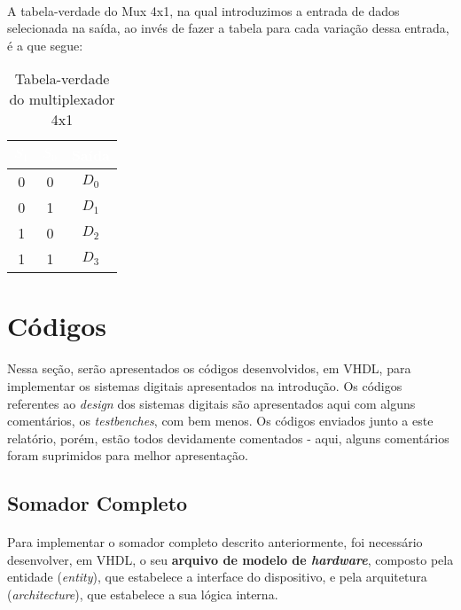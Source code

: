 \documentclass[a4paper,12pt]{article}
\begin{document}
\paragraph{}
A tabela-verdade do Mux 4x1, na qual introduzimos a entrada de dados selecionada na saída, ao invés de fazer a tabela para cada variação dessa entrada, é a que segue:

\begin{table}[H]
    \centering
    \begin{tabular}{|c|c|c|}
        \hline
        \rowcolor{black}
        \textcolor{white}{$S_1$} & \textcolor{white}{$S_0$} & \textcolor{white}{Saída} \\ \hline
        0 & 0 & $D_0$ \\ \hline
        \rowcolor{cinza}
        0 & 1 & $D_1$ \\ \hline
        1 & 0 & $D_2$ \\ \hline
        \rowcolor{cinza}
        1 & 1 & $D_3$ \\ \hline
    \end{tabular}
    \caption{Tabela-verdade do multiplexador 4x1}
\end{table}

\newpage

\section{Códigos}
\paragraph{}
Nessa seção, serão apresentados os códigos desenvolvidos, em VHDL, para implementar os sistemas digitais apresentados na introdução. Os códigos referentes ao \textit{design} dos sistemas digitais são apresentados aqui com alguns comentários, os \textit{testbenches}, com bem menos. Os códigos enviados junto a este relatório, porém, estão todos devidamente comentados - aqui, alguns comentários foram suprimidos para melhor apresentação.

\subsection{Somador Completo}
\paragraph{}
Para implementar o somador completo descrito anteriormente, foi necessário desenvolver, em VHDL, o seu \textbf{arquivo de modelo de \textit{hardware}}, composto pela entidade (\textit{entity}), que estabelece a interface do dispositivo, e pela arquitetura (\textit{architecture}), que estabelece a sua lógica interna.
\end{document}
